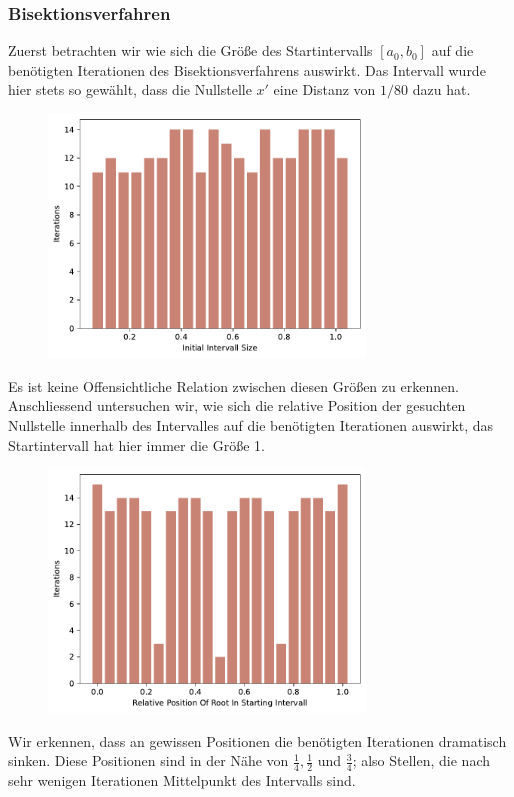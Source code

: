 \documentclass[a4paper,12pt]{article}
\newcommand{\1}{1\hspace{-0,9ex}1}
\begin{document}
\subsubsection*{Bisektionsverfahren}
Zuerst betrachten wir wie sich die Größe des Startintervalls $[a_0, b_0]$ auf die benötigten Iterationen des Bisektionsverfahrens auswirkt. Das Intervall wurde hier stets so gewählt, dass die Nullstelle $x'$ eine Distanz von $1/80$ dazu hat.
\begin{figure}[H]
	\centering
	\includegraphics[width=0.75\textwidth]{plots/bisection_iterations_by_intervall_size.pdf}
\end{figure}
Es ist keine Offensichtliche Relation zwischen diesen Größen zu erkennen. Anschliessend untersuchen wir, wie sich die relative Position der gesuchten Nullstelle innerhalb des Intervalles auf die benötigten Iterationen auswirkt, das Startintervall hat hier immer die Größe 1.
\begin{figure}[H]
	\centering
	\includegraphics[width=0.75\textwidth]{plots/bisection_iterations_by_relative_position_of_root.pdf}
\end{figure}
Wir erkennen, dass an gewissen Positionen die benötigten Iterationen dramatisch sinken. Diese Positionen sind in der Nähe von $\frac{1}{4}, \frac{1}{2}$ und $\frac{3}{4}$; also Stellen, die nach sehr wenigen Iterationen Mittelpunkt des Intervalls sind.
\end{document}
